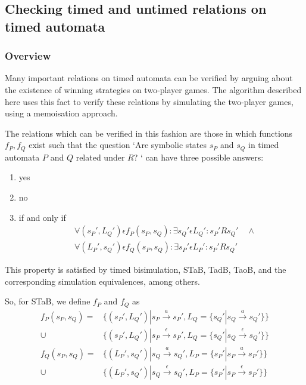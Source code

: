 \documentclass[a4paper]{llncs}
\begin{document}
\subsection{Checking timed and untimed relations on timed automata}

\subsubsection{Overview}

Many important relations on timed automata can be verified by arguing
about the existence of winning strategies on two-player games. The
algorithm described here uses this fact to verify these relations
by simulating the two-player games, using a memoisation approach.

The relations which can be verified in this fashion are those in which
functions $f_P, f_Q$ exist such that
the question `Are symbolic states $s_P$ and $s_Q$ in timed automata $P$ and $Q$
related under $R$? ` can have three possible answers:
\begin{enumerate}
\item yes
\item no
\item if and only if 
  \begin{align*} 
    &\forall (s_P', L_Q') \epsilon f_P(s_P, s_Q): \exists s_Q' \epsilon
    L_Q': s_P' R s_Q' \quad \wedge \\
    &\forall (L_P', s_Q') \epsilon f_Q(s_P, s_Q): \exists s_P' \epsilon
    L_P': s_P' R s_Q'
  \end{align*} 
\end{enumerate}

This property is satisfied by timed bisimulation, STaB, TadB, TaoB,
and the corresponding simulation equivalences, among others.

So, for STaB, we define $f_P$ and $f_Q$ as
\begin{align*}
  f_P(s_P, s_Q) = & \{(s_P', L_Q') | s_P \xrightarrow{a} s_P', 
  L_Q=\{ s_Q' | s_Q \xrightarrow{a} s_Q'\}\} \\
  \cup & \{(s_P', L_Q') | s_P \xrightarrow{\epsilon} s_P', 
  L_Q=\{ s_Q' | s_Q \xrightarrow{\epsilon} s_Q'\}\} \\
  f_Q(s_P, s_Q) = & \{(L_P', s_Q') | s_Q \xrightarrow{a} s_Q', 
  L_P=\{ s_P' | s_P \xrightarrow{a} s_P'\}\} \\
  \cup & \{(L_P', s_Q') | s_Q \xrightarrow{\epsilon} s_Q', 
  L_P=\{ s_P' | s_P \xrightarrow{\epsilon} s_P'\}\} 
\end{align*}
\end{document}
